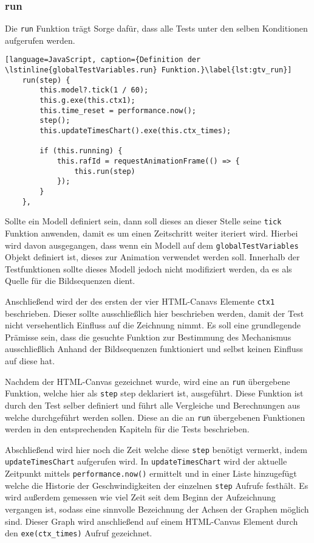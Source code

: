 
\subsubsection{run}\label{ch:gtv_run}

Die \lstinline{run} Funktion trägt Sorge dafür, dass alle Tests unter den selben Konditionen aufgerufen werden.

\begin{lstlisting}[language=JavaScript, caption={Definition der \lstinline{globalTestVariables.run} Funktion.}\label{lst:gtv_run}]
    run(step) {
        this.model?.tick(1 / 60);
        this.g.exe(this.ctx1);
        this.time_reset = performance.now();
        step();
        this.updateTimesChart().exe(this.ctx_times);
    
        if (this.running) {
            this.rafId = requestAnimationFrame(() => {
                this.run(step)
            });
        }
    },
\end{lstlisting}

Sollte ein  Modell definiert sein, dann soll dieses an dieser Stelle seine \lstinline{tick} Funktion anwenden, damit es um einen Zeitschritt weiter iteriert wird.
Hierbei wird davon ausgegangen, dass wenn ein  Modell auf dem \lstinline{globalTestVariables} Objekt definiert ist, dieses zur Animation verwendet werden soll.
Innerhalb der Testfunktionen sollte dieses Modell jedoch nicht modifiziert werden, da es als Quelle für die Bildsequenzen dient.

Anschließend wird der  des ersten der vier HTML-Canavs Elemente \lstinline{ctx1} beschrieben.
Dieser sollte ausschließlich hier beschrieben werden, damit der Test nicht versehentlich Einfluss auf die Zeichnung nimmt.
Es soll eine grundlegende Prämisse sein, dass die gesuchte Funktion zur Bestimmung des Mechanismus ausschließlich Anhand der Bildsequenzen funktioniert und selbst keinen Einfluss auf diese hat.

Nachdem der HTML-Canvas gezeichnet wurde, wird eine an \lstinline{run} übergebene Funktion, welche hier als \lstinline{step} step deklariert ist, ausgeführt.
Diese Funktion ist durch den Test selber definiert und führt alle Vergleiche und Berechnungen aus welche durchgeführt werden sollen.
Diese an die an \lstinline{run} übergebenen Funktionen werden in den entsprechenden Kapiteln für die Tests beschrieben.

Abschließend wird hier noch die Zeit welche diese \lstinline{step} benötigt vermerkt, indem \lstinline{updateTimesChart} aufgerufen wird.
In \lstinline{updateTimesChart} wird der aktuelle Zeitpunkt mittels \lstinline{performance.now()} %
ermittelt und in einer Liste hinzugefügt welche die Historie der Geschwindigkeiten der einzelnen \lstinline{step} Aufrufe festhält.
Es wird außerdem gemessen wie viel Zeit seit dem Beginn der Aufzeichnung vergangen ist, sodass eine sinnvolle Bezeichnung der Achsen der Graphen möglich sind.
Dieser Graph wird anschließend auf einem HTML-Canvas Element durch den \lstinline{exe(ctx_times)} Aufruf gezeichnet.

